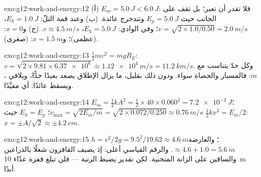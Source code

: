 \begin{solution}{exo:g12:work-and-energy:12}
(أ) $E_m = \qty{5.0}{J} < \qty{6.0}{J}$: فلا تقدر أن تعبر؛ بل تقف على
الجانب حيث $E_p = \qty{5.0}{J}$ وتتدحرج عائدة. (ب) وعند قمة التلّ:
$E_k = \qty{1.0}{J}$، $v = \sqrt{2 \times 1.0/0.50} = \qty{2.0}{m/s}$؛
وفي الوادي: $E_k = \qty{5.0}{J}$، $v \approx \qty{4.5}{m/s}$. (ج) و$x = 0$:
 (عظمى)؛ و$x = \qty{1.5}{m}$:  (صغرى).
\end{solution}

\begin{solution}{exo:g12:work-and-energy:13}
$\tfrac12 mv^2 = mgR_E$:
$v = \sqrt{2 \times 9.81 \times \num{6.37e6}} \approx \qty{1.12e4}{m/s}
= \qty{11.2}{km/s}$. وكل حدّ يتناسب مع $m$: فالمسبار
والحصاة سواء. ودون ذلك بقليل، ما يزال الإطلاق يصعد بعيدًا جدًّا،
ويلاقي ، ويسقط عائدًا: أي مقيَّدًا.
\end{solution}

\begin{solution}{exo:g12:work-and-energy:14}
$E_m = \tfrac12 kA^2 = \tfrac12 \times 40 \times 0.060^2 =
\qty{7.2e-2}{J}$؛ $v_{\max} = \sqrt{2E_m/m} =
\sqrt{2 \times 0.072/0.250} \approx \qty{0.76}{m/s}$؛
$E_k = E_p$ حيث $\tfrac12 kx^2 = E_m/2$: $x = \pm A/\sqrt 2 \approx
\pm\qty{4.2}{cm}$.
\end{solution}

\begin{solution}{exo:g12:work-and-energy:15}
$h = v^2/2g = 9.5^2/19.62 \approx \qty{4.6}{m}$؛ والعارضة $\approx
4.6 + 1.0 = \qty{5.6}{m}$. والرقم القياسي أعلى: إذ يضيف القافزون شغلًا
بالذراعين والساقين على الزانة المنحنية. لكن تقدير  يضبط
الرتبة --- فلن تبلغ قفزة عدّاء \qty{10}{m} أبدًا.
\end{solution}

